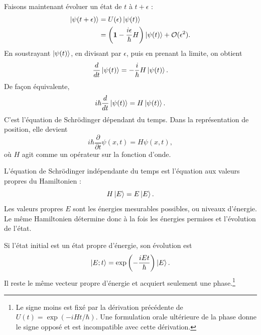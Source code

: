 Faisons maintenant évoluer un état de \(t\) à \(t+\epsilon\) :
\begin{align}
\left\lvert\psi(t+\epsilon)\right\rangle
&=
U(\epsilon)\left\lvert\psi(t)\right\rangle
\\
&=
\left(
\mathbf 1-\frac{i\epsilon}{\hbar}H
\right)\left\lvert\psi(t)\right\rangle
+\mathcal O(\epsilon^2).
\end{align}
En soustrayant \(\left\lvert\psi(t)\right\rangle\), en divisant par \(\epsilon\), puis en prenant la limite, on obtient
\begin{equation}
\frac{d}{dt}\left\lvert\psi(t)\right\rangle
=
-\frac{i}{\hbar}H\left\lvert\psi(t)\right\rangle.
\end{equation}
De façon équivalente,
\begin{equation}
i\hbar\frac{d}{dt}\left\lvert\psi(t)\right\rangle
=
H\left\lvert\psi(t)\right\rangle.
\end{equation}
C’est l’équation de Schr\"odinger dépendant du temps. Dans la représentation de position, elle devient
\begin{equation}
i\hbar\frac{\partial}{\partial t}\psi(x,t)
=
H\psi(x,t),
\end{equation}
où \(H\) agit comme un opérateur sur la fonction d’onde.

L’équation de Schr\"odinger indépendante du temps est l’équation aux valeurs propres du Hamiltonien :
\begin{equation}
H\left\lvert E\right\rangle=E\left\lvert E\right\rangle.
\end{equation}
Les valeurs propres \(E\) sont les énergies mesurables possibles, ou niveaux d’énergie. Le même Hamiltonien détermine donc à la fois les énergies permises et l’évolution de l’état.

Si l’état initial est un état propre d’énergie, son évolution est
\begin{equation}
\left\lvert E;t\right\rangle
=
\exp\left(-\frac{iEt}{\hbar}\right)\left\lvert E\right\rangle.
\end{equation}
Il reste le même vecteur propre d’énergie et acquiert seulement une phase.\footnote{Le signe moins est fixé par la dérivation précédente de \(U(t)=\exp(-iHt/\hbar)\). Une formulation orale ultérieure de la phase donne le signe opposé et est incompatible avec cette dérivation.}

\begin{classroomqa}
\end{classroomqa}

